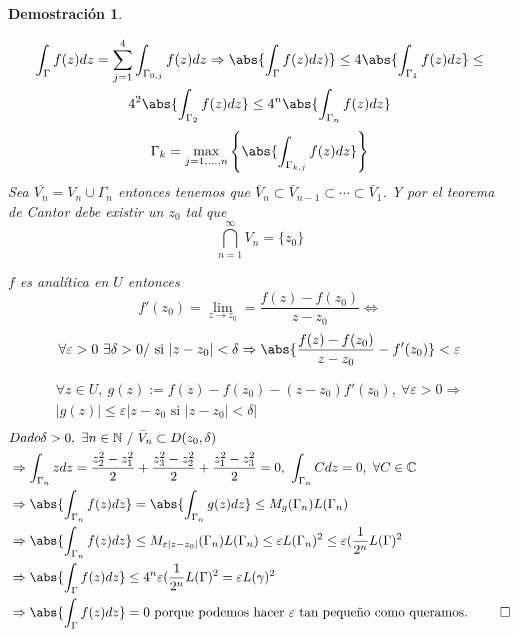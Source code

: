 \documentclass[10pt]{book}
\newtheorem*{dem}{Demostración}
\newcommand{\C}{\mathbb{C}}
\newcommand{\N}{\mathbb{N}}
\begin{document}
\begin{dem}
\begin{figure}[H]
\begin{center}
\end{center}
\end{figure}
	
\begin{multline*}
\int_\Gamma f(z)dz = \sum_{j=1}^4\int_{\Gamma_{0,j}} f(z) dz \Rightarrow \abs{\int_\Gamma f(z)dz)}\leq 4\abs{\int_{\Gamma_1}f(z)dz} \leq\\
 4^2\abs{\int_{\Gamma_2}f(z)dz}\leq 4^n \abs{\int_{\Gamma_n} f(z)dz}
\end{multline*}
$$\Gamma_k = \max_{j=1,\ldots, n} \left\{\abs{\int_{\Gamma_{k,j}}f(z)dz}\right\}$$
Sea $\bar{V_n} = V_n \cup \Gamma_n$ entonces tenemos que $\bar{V}_n\subset \bar{V}_{n-1}\subset \cdots \subset \bar{V}_1$. Y por el teorema de Cantor debe existir un $z_0$ tal que 
$$\bigcap_{n=1}^\infty V_n = \{z_0\}$$

$f$ es analítica en $U$ entonces $$f'(z_0) = \lim_{z\to z_0}= \frac{f(z)-f(z_0)}{z-z_0}\Leftrightarrow $$ $$\forall \varepsilon>0\ \exists \delta>0 / \text{ si } |z-z_0|<\delta\Rightarrow \abs{\frac{f(z)-f(z_0)}{z-z_0}-f'(z_0)} <\varepsilon $$

\begin{multline*}\forall z\in U, \ g(z) := f(z) -f(z_0) -(z-z_0)f'(z_0),\ \forall \varepsilon>0 \Rightarrow\\
 |g(z)|\leq \varepsilon|z-z_0 \text{ si } |z-z_0|< \delta|
 \end{multline*}
 \begin{align*}
 &Dado \delta>0,\ \exists n\in\N \ /\ \bar{V}_n \subset D(z_0,\delta)\\
 & \Rightarrow \int_{\Gamma_n}zdz = \frac{z_2^2 -z_1^2}{2}+\frac{z_3^2 -z_2^2}{2}+\frac{z_1^2 -z_3^2}{2} = 0, \ \int_{\Gamma_n} Cdz = 0,\ \forall C \in \C\\
 & \Rightarrow \abs{\int_{\Gamma_n}f(z)dz} = \abs{\int_{\Gamma_n}g(z)dz}  \leq M_g(\Gamma_n)L(\Gamma_n)\\
 & \Rightarrow \abs{\int_{\Gamma_n}f(z)dz} \leq M_{\varepsilon|z-z_0|}(\Gamma_n)L(\Gamma_n) \leq \varepsilon L(\Gamma_n)^2 \leq \varepsilon ( \frac{1}{2^n}L(\Gamma)^2\\
 & \Rightarrow \abs{\int_{\Gamma}f(z)dz} \leq 4^n \varepsilon (\frac{1}{2^n}L(\Gamma)^2 = \varepsilon L(\gamma)^2 \\
 & \Rightarrow \abs{\int_{\Gamma}f(z)dz} = 0\text{ porque podemos hacer }\varepsilon \text{ tan pequeño como queramos. }\qed
 \end{align*}
\end{dem}
\end{document}
